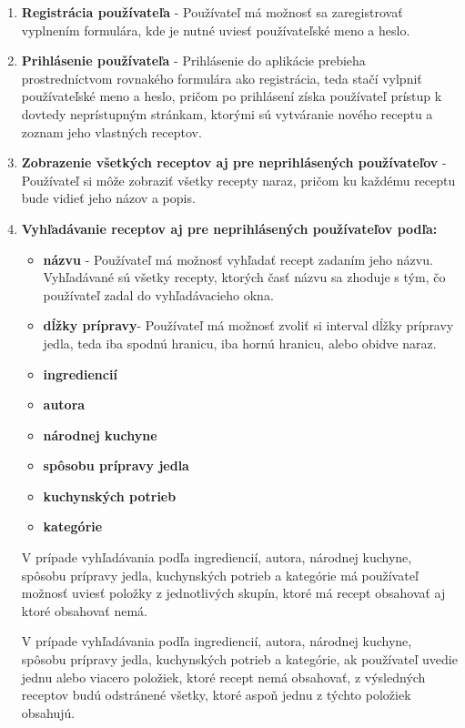 \begin{enumerate}
\item \textbf{Registrácia používateľa} - Používateľ má možnosť sa zaregistrovať vyplnením formulára, kde je nutné uviesť používateľské meno a heslo. 

\item \textbf{Prihlásenie používateľa} - Prihlásenie do aplikácie prebieha prostredníctvom rovnakého formulára ako registrácia, teda stačí vylpniť používateľské meno a heslo, pričom po prihlásení získa používateľ prístup k dovtedy neprístupným stránkam, ktorými sú vytváranie nového receptu a zoznam jeho vlastných receptov.

\item \textbf{Zobrazenie všetkých receptov aj pre neprihlásených používateľov} - Používateľ si môže zobraziť všetky recepty naraz, pričom ku každému receptu bude vidieť jeho názov a popis. 

\item \textbf{Vyhľadávanie receptov aj pre neprihlásených používateľov podľa:} 
\begin{itemize}
\item \textbf{názvu} - Používateľ má možnosť vyhľadať recept zadaním jeho názvu. Vyhľadávané sú všetky recepty, ktorých časť názvu sa zhoduje s tým, čo používateľ zadal do vyhľadávacieho okna.
\item \textbf{dĺžky prípravy}- Používateľ má možnosť zvoliť si interval dĺžky prípravy jedla, teda iba spodnú hranicu, iba hornú hranicu, alebo obidve naraz. 
\item \textbf{ingrediencií}  
\item \textbf{autora}  
\item \textbf{národnej kuchyne} 
\item \textbf{spôsobu prípravy jedla} 
\item \textbf{kuchynských potrieb} 
\item \textbf{kategórie} 
\end{itemize}

V prípade vyhľadávania podľa ingrediencií, autora, národnej kuchyne, spôsobu prípravy jedla, kuchynských potrieb a kategórie má používateľ možnosť uviesť položky z jednotlivých skupín, ktoré má recept obsahovať aj ktoré obsahovať nemá. 

V prípade vyhľadávania podľa ingrediencií, autora, národnej kuchyne, spôsobu prípravy jedla, kuchynských potrieb a kategórie, ak používateľ uvedie jednu alebo viacero položiek, ktoré recept nemá obsahovať, z výsledných receptov budú odstránené všetky, ktoré aspoň jednu z týchto  položiek obsahujú. 


\end{enumerate}
